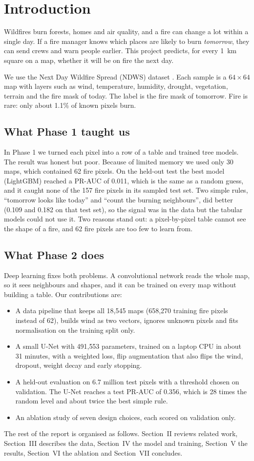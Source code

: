 \section{Introduction}
Wildfires burn forests, homes and air quality, and a fire can change a lot within a single day. If a fire manager knows which places are likely to burn \emph{tomorrow}, they can send crews and warn people earlier. This project predicts, for every 1~km square on a map, whether it will be on fire the next day.

We use the Next Day Wildfire Spread (NDWS) dataset \cite{huot2022nextday}. Each sample is a $64\times64$ map with layers such as wind, temperature, humidity, drought, vegetation, terrain and the fire mask of today. The label is the fire mask of tomorrow. Fire is rare: only about 1.1\% of known pixels burn.

\subsection{What Phase 1 taught us}
In Phase 1 we turned each pixel into a row of a table and trained tree models. The result was honest but poor. Because of limited memory we used only 30 maps, which contained 62 fire pixels. On the held-out test the best model (LightGBM) reached a PR-AUC of 0.011, which is the same as a random guess, and it caught none of the 157 fire pixels in its sampled test set. Two simple rules, ``tomorrow looks like today'' and ``count the burning neighbours'', did better (0.109 and 0.182 on that test set), so the signal was in the data but the tabular models could not use it. Two reasons stand out: a pixel-by-pixel table cannot see the shape of a fire, and 62 fire pixels are too few to learn from.

\subsection{What Phase 2 does}
Deep learning fixes both problems. A convolutional network reads the whole map, so it sees neighbours and shapes, and it can be trained on every map without building a table. Our contributions are:
\begin{itemize}
\item A data pipeline that keeps all 18{,}545 maps (658{,}270 training fire pixels instead of 62), builds wind as two vectors, ignores unknown pixels and fits normalisation on the training split only.
\item A small U-Net with 491{,}553 parameters, trained on a laptop CPU in about 31 minutes, with a weighted loss, flip augmentation that also flips the wind, dropout, weight decay and early stopping.
\item A held-out evaluation on 6.7 million test pixels with a threshold chosen on validation. The U-Net reaches a test PR-AUC of 0.356, which is 28 times the random level and about twice the best simple rule.
\item An ablation study of seven design choices, each scored on validation only.
\end{itemize}

The rest of the report is organised as follows. Section~II reviews related work, Section~III describes the data, Section~IV the model and training, Section~V the results, Section~VI the ablation and Section~VII concludes.
